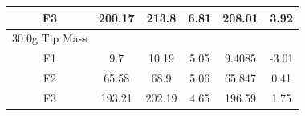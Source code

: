 \documentclass[11pt]{article}
\begin{document}
\begin{table}[H]
\begin{tabular}{|c|c|c|c|c|c|}
F3                                             & 200.17                                                                                                                   & 213.8                                                                 & \cellcolor[HTML]{FFFC9E}6.81                                                                  & 208.01                                                                   & \cellcolor[HTML]{FFFC9E}3.92                                                                  \\ \hline
\rowcolor[HTML]{C0C0C0} 
30.0g Tip Mass                         &                                                                                                                          &                                                                       &                                                                       &                                                                          &                                                                       \\ \hline
F1                                             & 9.7                                                                                                                      & 10.19                                                                 & \cellcolor[HTML]{FFFC9E}5.05                                                                  & 9.4085                                                                   &\cellcolor[HTML]{FFFC9E} -3.01                                                                 \\ \hline
F2                                             & 65.58                                                                                                                    & 68.9                                                                  & \cellcolor[HTML]{FFFC9E}5.06                                                                  & 65.847                                                                   &\cellcolor[HTML]{FFFC9E} 0.41                                                                  \\ \hline
F3                                             & 193.21                                                                                                                   & 202.19                                                                & \cellcolor[HTML]{FFFC9E}4.65                                                                  & 196.59                                                                   &\cellcolor[HTML]{FFFC9E} 1.75                                                                  \\ \hline
\end{tabular}
\label{tab:lab2res}
\end{table}
\end{document}
